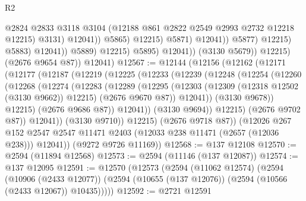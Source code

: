 \begin{lexlean}{R2}
\begin{coremodule}
                                                @2824
                                                @2833
                                                @3118
                                                @3104
                                                (@12188 @861 @2822 @2549 @2993 @2732 @12218 @12215)
                                                @3131)
                                              @12041))
                                          @5865)
                                        @12215)
                                      @5871)
                                    @12041))
                                @5877)
                              @12215)
                            @5883)
                          @12041))
                      @5889)
                    @12215)
                  @5895)
                @12041))
            (@3130 @5679))
          @12215)
        (@2676 @9654 @87))
      @12041)
@12567 := @12144
    (@12156
      (@12162
        (@12171
          (@12177
            (@12187
              (@12219
                (@12225
                  (@12233
                    (@12239
                      (@12248
                        (@12254
                          (@12260
                            (@12268
                              (@12274
                                (@12283
                                  (@12289
                                    (@12295
                                      (@12303
                                        (@12309 (@12318 @12502 (@3130 @9662)) @12215)
                                        (@2676 @9670 @87))
                                      @12041))
                                  (@3130 @9678))
                                @12215)
                              (@2676 @9686 @87))
                            @12041))
                        (@3130 @9694))
                      @12215)
                    (@2676 @9702 @87))
                  @12041))
              (@3130 @9710))
            @12215)
          (@2676 @9718 @87))
        (@12026
          @267
          @152
          @2547
          @2547
          @11471
          @2403
          (@12033 @238 @11471 (@2657 (@12036 @238)))
          @12041))
      (@9272 @9726 @11169))
@12568 := @137 @12108
@12570 := @2594 (@11894 @12568)
@12573 := @2594 (@11146 (@137 @12087))
@12574 := @137 @12095
@12591 := @12570
    (@12573
      (@2594
        (@11062 @12574)
        (@2594
          (@10906 (@2433 @12077))
          (@2594 (@10655 (@137 @12076)) (@2594 (@10566 (@2433 @12067)) @10435)))))
@12592 := @2721 @12591

\end{coremodule}
\end{lexlean}
